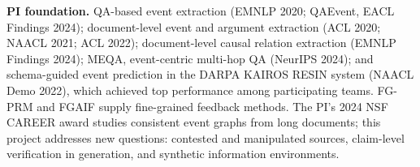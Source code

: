 \documentclass[11pt]{article}
\newcommand{\head}[1]{{\color{navy}\textbf{#1}}\enspace}
\begin{document}
\head{PI foundation.} QA-based event extraction (EMNLP 2020; QAEvent, EACL Findings 2024); document-level event and argument extraction (ACL 2020; NAACL 2021; ACL 2022); document-level causal relation extraction (EMNLP Findings 2024); MEQA, event-centric multi-hop QA (NeurIPS 2024); and schema-guided event prediction in the DARPA KAIROS RESIN system (NAACL Demo 2022), which achieved top performance among participating teams. FG-PRM and FGAIF supply fine-grained feedback methods. The PI's 2024 NSF CAREER award studies consistent event graphs from long documents; this project addresses new questions: contested and manipulated sources, claim-level verification in generation, and synthetic information environments.
\end{document}
